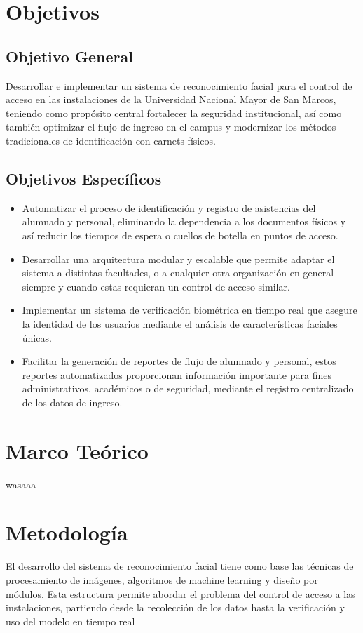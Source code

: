 \documentclass[12pt]{article}
\begin{document}
{%
\section{Objetivos}
\subsection{Objetivo General}
Desarrollar e implementar un sistema de reconocimiento facial para el control de acceso en las instalaciones de la Universidad Nacional Mayor de San Marcos, teniendo como propósito central fortalecer la seguridad institucional, así como también optimizar el flujo de ingreso en el campus y modernizar los métodos tradicionales de identificación con carnets físicos.

\subsection{Objetivos Específicos}
\begin{itemize}
    \item Automatizar el proceso de identificación y registro de asistencias del alumnado y personal, eliminando la dependencia a los documentos físicos y así reducir los tiempos de espera o cuellos de botella en puntos de acceso.
    \item Desarrollar una arquitectura modular y escalable que permite adaptar el sistema a distintas facultades, o a cualquier otra organización en general siempre y cuando estas requieran un control de acceso similar.
    \item Implementar un sistema de verificación biométrica en tiempo real que asegure la identidad de los usuarios mediante el análisis de características faciales únicas.
    \item Facilitar la generación de reportes de flujo de alumnado y personal, estos reportes automatizados proporcionan información importante para fines administrativos, académicos o de seguridad, mediante el registro centralizado de los datos de ingreso.
\end{itemize}


\section{Marco Teórico}
wasaaa


\section{Metodología}
El desarrollo del sistema de reconocimiento facial tiene como base las técnicas de procesamiento de imágenes, algoritmos de machine learning y diseño por módulos. Esta estructura permite abordar el problema del control de acceso a las instalaciones, partiendo desde la recolección de los datos hasta la verificación y uso del modelo en tiempo real

}
\end{document}
